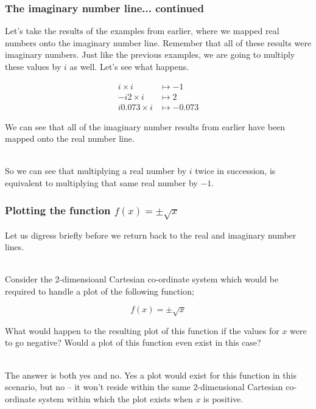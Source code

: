 \begin{frame}
\frametitle{The imaginary number line... continued}

Let's take the results of the examples from earlier, where we mapped real numbers onto the imaginary number line. Remember that all of these results were
imaginary numbers. Just like the previous examples, we are going to multiply these values by \(i\) as well. Let's see what happens.

\begin{align*}
i \times i      &\mapsto -1 \\
-i2 \times i    &\mapsto 2 \\
i0.073 \times i &\mapsto -0.073
\end{align*}

We can see that all of the imaginary number results from earlier have been mapped onto the real number line.\\~\

So we can see that multiplying a real number by \(i\) twice in succession, is equivalent to multiplying that same real number by \(-1\).

\end{frame}


%
%

\begin{frame}
\frametitle{Plotting the function \(f(x) = \pm\sqrt{x}\)}

Let us digress briefly before we return back to the real and imaginary number lines.\\~\

Consider the 2-dimensioanl Cartesian co-ordinate system which would be required to handle a plot of the following function;

\begin{equation}
  f(x) = \pm\sqrt{x}
\end{equation}

What would happen to the resulting plot of this function if the values for \(x\) were to go negative? Would a plot of this function even exist in this case?\\~\

The answer is both yes and no. Yes a plot would exist for this function in this scenario, but no -- it won't reside within the same 2-dimensional Cartesian
co-ordinate system within which the plot exists when \(x\) is positive.\\~\

\end{frame}


